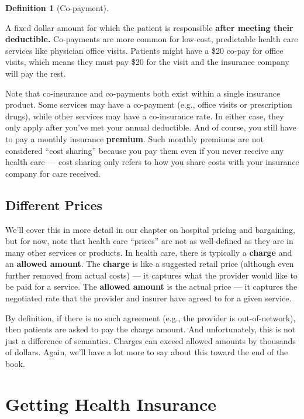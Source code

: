 \documentclass[
  letterpaper,
  DIV=11,
  numbers=noendperiod]{scrreport}
\theoremstyle{definition}
\newtheorem{definition}{Definition}[chapter]
\theoremstyle{remark}
\begin{document}
\begin{definition}[Co-payment]\protect\hypertarget{def-copayment}{}\label{def-copayment}

A fixed dollar amount for which the patient is responsible \textbf{after
meeting their deductible.} Co-payments are more common for low-cost,
predictable health care services like physician office visits. Patients
might have a \$20 co-pay for office visits, which means they must pay
\$20 for the visit and the insurance company will pay the rest.

\end{definition}

Note that co-insurance and co-payments both exist within a single
insurance product. Some services may have a co-payment (e.g., office
visits or prescription drugs), while other services may have a
co-insurance rate. In either case, they only apply after you've met your
annual deductible. And of course, you still have to pay a monthly
insurance \textbf{premium}. Such monthly premiums are not considered
``cost sharing'' because you pay them even if you never receive any
health care --- cost sharing only refers to how you share costs with
your insurance company for care received.

\hypertarget{sec-prices1}{%
\section{Different Prices}\label{sec-prices1}}

We'll cover this in more detail in our chapter on hospital pricing and
bargaining, but for now, note that health care ``prices'' are not as
well-defined as they are in many other services or products. In health
care, there is typically a \textbf{charge} and an \textbf{allowed
amount}. The \textbf{charge} is like a suggested retail price (although
even further removed from actual costs) --- it captures what the
provider would like to be paid for a service. The \textbf{allowed
amount} is the actual price --- it captures the negotiated rate that the
provider and insurer have agreed to for a given service.

By definition, if there is no such agreement (e.g., the provider is
out-of-network), then patients are asked to pay the charge amount. And
unfortunately, this is not just a difference of semantics. Charges can
exceed allowed amounts by thousands of dollars. Again, we'll have a lot
more to say about this toward the end of the book.

\hypertarget{getting-health-insurance}{%
\chapter{Getting Health Insurance}\label{getting-health-insurance}}
\end{document}
